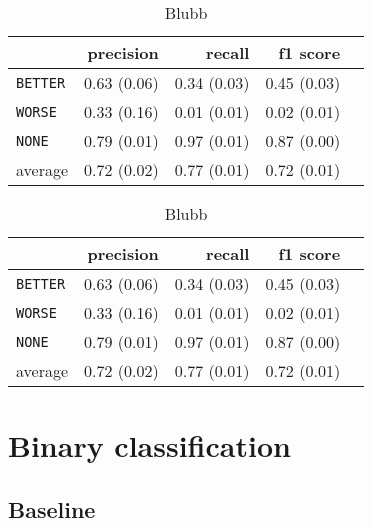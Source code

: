 \begin{table}[!htb]
    \caption{Global caption}
    \begin{minipage}{.52\linewidth}
      \caption{Bla blubb}
      \centering
 \begin{tabular}{@{}lrrrr@{}}
\toprule
 	&	 precision &	 recall &	 f1 score  \\ \midrule 
\texttt{BETTER}	&	 0.63 \scriptsize{(0.06)} &	 0.34 \scriptsize{(0.03)} & 0.45 \scriptsize{(0.03)}  \\ 
\texttt{WORSE}	&	 0.33 \scriptsize{(0.16)} &	 0.01 \scriptsize{(0.01)} & 0.02 \scriptsize{(0.01)}  \\ 
\texttt{NONE}	&	 0.79 \scriptsize{(0.01)} &	 0.97 \scriptsize{(0.01)} & 0.87 \scriptsize{(0.00)}  \\ \midrule
average	&	 0.72 \scriptsize{(0.02)} &	 0.77 \scriptsize{(0.01)} & 0.72 \scriptsize{(0.01)}  \\ 
\bottomrule
\end{tabular}
    \end{minipage}%
    \begin{minipage}{.5\linewidth}
      \centering
        \caption{Blubb}
 \begin{tabular}{@{}lrrrr@{}}
\toprule
 	&	 precision &	 recall &	 f1 score  \\ \midrule 
\texttt{BETTER}	&	 0.63 \scriptsize{(0.06)} &	 0.34 \scriptsize{(0.03)} & 0.45 \scriptsize{(0.03)}  \\ 
\texttt{WORSE}	&	 0.33 \scriptsize{(0.16)} &	 0.01 \scriptsize{(0.01)} & 0.02 \scriptsize{(0.01)}  \\ 
\texttt{NONE}	&	 0.79 \scriptsize{(0.01)} &	 0.97 \scriptsize{(0.01)} & 0.87 \scriptsize{(0.00)}  \\ \midrule
average	&	 0.72 \scriptsize{(0.02)} &	 0.77 \scriptsize{(0.01)} & 0.72 \scriptsize{(0.01)}  \\ 
\bottomrule
\end{tabular}
    \end{minipage} 
\end{table}



\section{Binary classification}
\subsection{Baseline}

